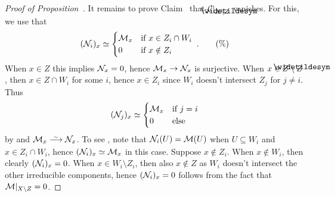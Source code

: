 \documentclass[a4paper,parskip=half,numbers=enddot, DIV=12]{scrreprt}
\begin{document}
\begin{proof}[Proof of Proposition~]
It remains to prove Claim~ that $\Cc|_{X\setminus \snake{Z}}$ vanishes. For this, we use that
\begin{align}\lbl{eq:stalksOfNn}
	(\Nn_i)_x\simeq\begin{cases}
		\Mm_x & \text{if }x\in Z_i\cap W_i\\
		0 & \text{if }x\notin Z_i
	\end{cases}\;.\tag{\%}
\end{align}
When $x\in Z$ this implies $\mathcal{N}_x=0$, hence $\Mm_x\morphism\Nn_x$ is surjective. When $x\in Z\setminus \snake{Z}$, then $x\in Z\cap W_i$ for some $i$, hence $x\in Z_i$ since $W_i$ doesn't intersect $Z_j$ for $j\neq i$. Thus
\begin{align*}
	(\mathcal{N}_j)_x\simeq\begin{cases}
	\mathcal{M}_x & \text{if }j=i\\
	0 & \text{else}
	\end{cases}
\end{align*}
by  and $\Mm_x\isomorphism\Nn_x$. To see , note that $\mathcal{N}_i(U)=\mathcal{M}(U)$ when $U\subseteq W_i$ and $x\in Z_i\cap W_i$, hence $(\mathcal{N}_i)_x\simeq \mathcal{M}_x$ in this case. Suppose $x\notin Z_i$. When $x\notin W_i$, then clearly $(\mathcal{N}_i)_x=0$. When $x\in W_i\setminus Z_i$, then also $x\notin Z$ as $W_i$ doesn't intersect the other irreducible components, hence $(\mathcal{N}_i)_x=0$ follows from the fact that $\mathcal{M}|_{X\setminus Z}=0$.
\end{proof}
\end{document}
